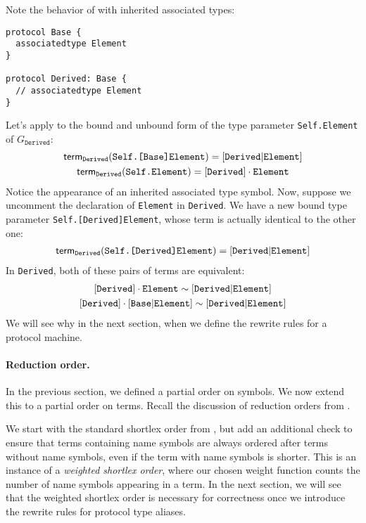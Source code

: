 \documentclass[../generics]{subfiles}
\begin{document}
\begin{example}
Note the behavior of  with inherited associated types:
\begin{Verbatim}
protocol Base {
  associatedtype Element
}

protocol Derived: Base {
  // associatedtype Element
}
\end{Verbatim}
Let's apply  to the bound and unbound form of the type parameter \texttt{Self.Element} of $G_\texttt{Derived}$:
\begin{gather*}
\mathsf{term}_{\texttt{Derived}}(\texttt{Self.[Base]Element}) = [\texttt{Derived}|\texttt{Element}]\\
\mathsf{term}_{\texttt{Derived}}(\texttt{Self.Element}) = [\texttt{Derived}]\cdot\texttt{Element}
\end{gather*}
Notice the appearance of an inherited associated type symbol. Now, suppose we uncomment the declaration of \texttt{Element} in \texttt{Derived}. We have a new bound type parameter \texttt{Self.[Derived]Element}, whose term is actually identical to the other one:
\begin{gather*}
\mathsf{term}_{\texttt{Derived}}(\texttt{Self.[Derived]Element}) = [\texttt{Derived}|\texttt{Element}]
\end{gather*}
In \texttt{Derived}, both of these pairs of terms are equivalent:
\begin{gather*}
\protosym{Derived}\cdot\nElement\sim\assocsym{Derived}{Element}\\
\protosym{Derived}\cdot\assocsym{Base}{Element}\sim\assocsym{Derived}{Element}
\end{gather*}
We will see why in the next section, when we define the rewrite rules for a protocol machine.
\end{example}

\paragraph{Reduction order.}
In the previous section, we defined a partial order on symbols. We now extend this to a partial order on terms. Recall the discussion of reduction orders from .

We start with the standard shortlex order from , but add an additional check to ensure that terms containing name symbols are always ordered after terms without name symbols, even if the term with name symbols is shorter. This is an instance of a \emph{weighted shortlex order}, where our chosen weight function counts the number of name symbols appearing in a term. In the next section, we will see that the weighted shortlex order is necessary for correctness once we introduce the rewrite rules for protocol type aliases.
\end{document}
